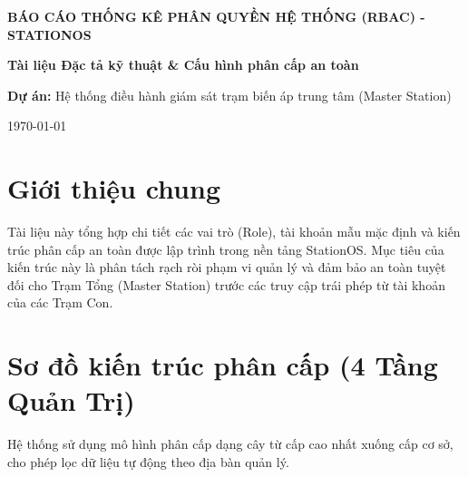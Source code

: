 \documentclass[12pt]{article}
\begin{document}
\begin{titlepage}
    \centering
    \vspace*{2cm}
    {\huge\bfseries BÁO CÁO THỐNG KÊ PHÂN QUYỀN HỆ THỐNG (RBAC) - STATIONOS\par}
    \vspace{1.5cm}
    {\large\bfseries Tài liệu Đặc tả kỹ thuật \& Cấu hình phân cấp an toàn\par}
    \vspace{2cm}
    \textbf{Dự án:} Hệ thống điều hành giám sát trạm biến áp trung tâm (Master Station)\\
    \vfill
    {\large \today \par}
\end{titlepage}

\section{Giới thiệu chung}
Tài liệu này tổng hợp chi tiết các vai trò (Role), tài khoản mẫu mặc định và kiến trúc phân cấp an toàn được lập trình trong nền tảng StationOS. Mục tiêu của kiến trúc này là phân tách rạch ròi phạm vi quản lý và đảm bảo an toàn tuyệt đối cho Trạm Tổng (Master Station) trước các truy cập trái phép từ tài khoản của các Trạm Con.

\section{Sơ đồ kiến trúc phân cấp (4 Tầng Quản Trị)}
Hệ thống sử dụng mô hình phân cấp dạng cây từ cấp cao nhất xuống cấp cơ sở, cho phép lọc dữ liệu tự động theo địa bàn quản lý.
\end{document}
